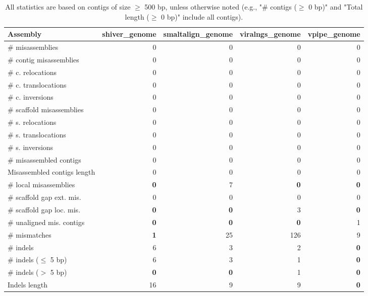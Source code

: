 \documentclass[12pt,a4paper]{article}
\begin{document}
\begin{table}[ht]
\begin{center}
\caption{All statistics are based on contigs of size $\geq$ 500 bp, unless otherwise noted (e.g., "\# contigs ($\geq$ 0 bp)" and "Total length ($\geq$ 0 bp)" include all contigs).}
\begin{tabular}{|l*{4}{|r}|}
\hline
Assembly & shiver\_genome & smaltalign\_genome & viralngs\_genome & vpipe\_genome \\ \hline
\# misassemblies & 0 & 0 & 0 & 0 \\ \hline
\hspace{2mm}\# contig misassemblies & 0 & 0 & 0 & 0 \\ \hline
\hspace{5mm}\# c. relocations & 0 & 0 & 0 & 0 \\ \hline
\hspace{5mm}\# c. translocations & 0 & 0 & 0 & 0 \\ \hline
\hspace{5mm}\# c. inversions & 0 & 0 & 0 & 0 \\ \hline
\hspace{2mm}\# scaffold misassemblies & 0 & 0 & 0 & 0 \\ \hline
\hspace{5mm}\# s. relocations & 0 & 0 & 0 & 0 \\ \hline
\hspace{5mm}\# s. translocations & 0 & 0 & 0 & 0 \\ \hline
\hspace{5mm}\# s. inversions & 0 & 0 & 0 & 0 \\ \hline
\# misassembled contigs & 0 & 0 & 0 & 0 \\ \hline
Misassembled contigs length & 0 & 0 & 0 & 0 \\ \hline
\# local misassemblies & {\bf 0} & 7 & {\bf 0} & {\bf 0} \\ \hline
\# scaffold gap ext. mis. & 0 & 0 & 0 & 0 \\ \hline
\# scaffold gap loc. mis. & {\bf 0} & {\bf 0} & 3 & {\bf 0} \\ \hline
\# unaligned mis. contigs & {\bf 0} & {\bf 0} & {\bf 0} & 1 \\ \hline
\# mismatches & {\bf 1} & 25 & 126 & 9 \\ \hline
\# indels & 6 & 3 & 2 & {\bf 0} \\ \hline
\hspace{5mm}\# indels ($\leq$ 5 bp) & 6 & 3 & 1 & {\bf 0} \\ \hline
\hspace{5mm}\# indels ($>$ 5 bp) & {\bf 0} & {\bf 0} & 1 & {\bf 0} \\ \hline
Indels length & 16 & 9 & 9 & {\bf 0} \\ \hline
\end{tabular}
\end{center}
\end{table}
\end{document}
